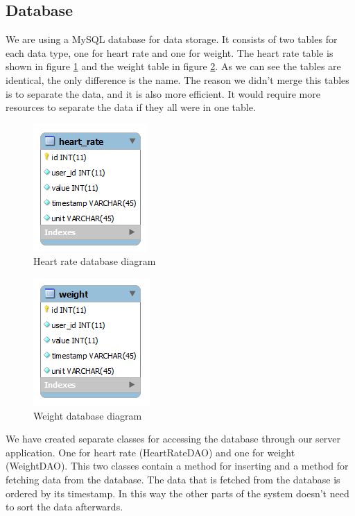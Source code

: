 \subsection{Database}

We are using a MySQL database for data storage.
It consists of two tables for each data type, one for heart rate and one for weight.
The heart rate table is shown in figure \ref{figure:heart-rate-database-diagram} and the weight table in figure \ref{figure:weight-database-diagram}. 
As we can see the tables are identical, the only difference is the name.
The reason we didn't merge this tables is to separate the data, and it is also more efficient.
It would require more resources to separate the data if they all were in one table.

\begin{figure}[h]
\centering
\includegraphics[scale=1.0]{../Figures/heart-rate-database-diagram.png}
\caption{Heart rate database diagram}
\label{figure:heart-rate-database-diagram}
\end{figure}

\begin{figure}[h]
\centering
\includegraphics[scale=1.0]{../Figures/weight-database-diagram.png}
\caption{Weight database diagram}
\label{figure:weight-database-diagram}
\end{figure}

We have created separate classes for accessing the database through our server application.
One for heart rate (HeartRateDAO) and one for weight (WeightDAO).
This two classes contain a method for inserting and a method for fetching data from the database.
The data that is fetched from the database is ordered by its timestamp.
In this way the other parts of the system doesn't need to sort the data afterwards.

